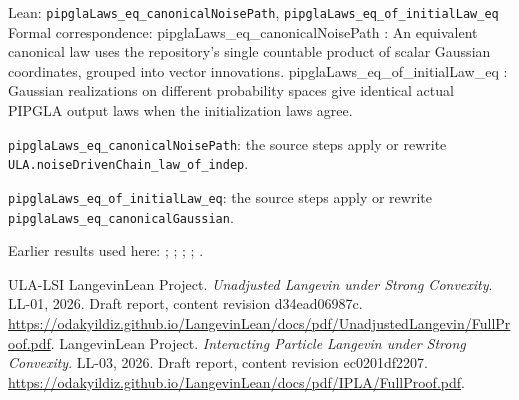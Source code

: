 \documentclass[11pt,a4paper]{article}
\begin{document}
\begin{leanbox}{Lean: \texttt{pipglaLaws\_\allowbreak{}eq\_\allowbreak{}canonicalNoisePath}, \texttt{pipglaLaws\_\allowbreak{}eq\_\allowbreak{}of\_\allowbreak{}initialLaw\_\allowbreak{}eq}}
Formal correspondence: pipglaLaws\_eq\_canonicalNoisePath : An equivalent canonical law uses the repository's single countable product of scalar Gaussian coordinates, grouped into vector innovations. pipglaLaws\_eq\_of\_initialLaw\_eq : Gaussian realizations on different probability spaces give identical actual PIPGLA output laws when the initialization laws agree.



\texttt{pipgla\allowbreak{}Laws\_\allowbreak{}eq\_\allowbreak{}canonical\allowbreak{}Noise\allowbreak{}Path}: the source steps apply or rewrite \texttt{ULA.\allowbreak{}noise\allowbreak{}Driven\allowbreak{}Chain\_\allowbreak{}law\_\allowbreak{}of\_\allowbreak{}indep}.



\texttt{pipgla\allowbreak{}Laws\_\allowbreak{}eq\_\allowbreak{}of\_\allowbreak{}initial\allowbreak{}Law\_\allowbreak{}eq}: the source steps apply or rewrite \texttt{pipgla\allowbreak{}Laws\_\allowbreak{}eq\_\allowbreak{}canonical\allowbreak{}Gaussian}.
\end{leanbox}


Earlier results used here: \cite[Section~3.20.5]{LangevinLean2026ULASC}; \cite[Section~3.20.7]{LangevinLean2026ULASC}; \cite[Section~3.1.1]{LangevinLean2026IPLA}; \cite[Section~3.15.1]{LangevinLean2026IPLA}; \cite[Section~3.3.2]{LangevinLean2026IPLA}.

\begin{thebibliography}{ULA-LSI}
LangevinLean Project. \emph{Unadjusted Langevin under Strong Convexity}. LL-01, 2026. Draft report, content revision d34ead06987c. \url{https://odakyildiz.github.io/LangevinLean/docs/pdf/UnadjustedLangevin/FullProof.pdf}.
LangevinLean Project. \emph{Interacting Particle Langevin under Strong Convexity}. LL-03, 2026. Draft report, content revision ec0201df2207. \url{https://odakyildiz.github.io/LangevinLean/docs/pdf/IPLA/FullProof.pdf}.
\end{thebibliography}
\end{document}
